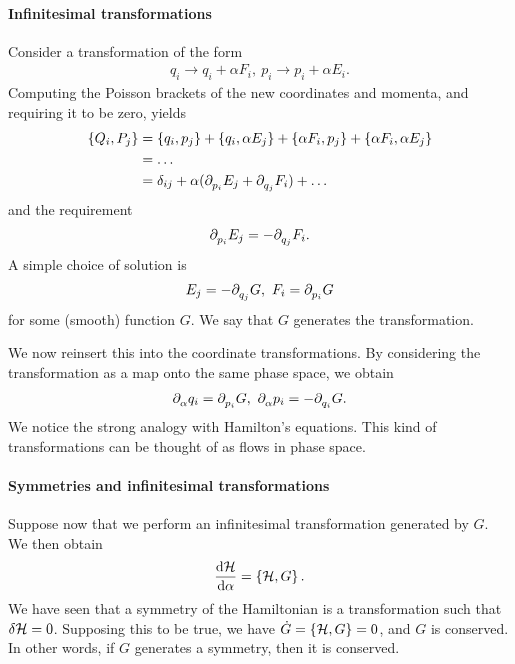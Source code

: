 \paragraph{Infinitesimal transformations}
Consider a transformation of the form
\begin{align*}
	q_{i} \to q_{i} + \alpha F_{i},\ p_{i} \to p_{i} + \alpha E_{i}.
\end{align*}
Computing the Poisson brackets of the new coordinates and momenta, and requiring it to be zero, yields
\begin{align*}
	\left\{Q_{i}, P_{j}\right\} &= \left\{q_{i}, p_{j}\right\} + \left\{q_{i}, \alpha E_{j}\right\} + \left\{\alpha F_{i}, p_{j}\right\} + \left\{\alpha F_{i}, \alpha E_{j}\right\} \\
	                   &= \dots \\
	                   &= \delta_{ij} + \alpha(\partial^{}_{p_{i}}E_{j} + \partial^{}_{q_{j}}F_{i}) + \dots
\end{align*}
and the requirement
\begin{align*}
	\partial^{}_{p_{i}}E_{j} = -\partial^{}_{q_{j}}F_{i}.
\end{align*}
A simple choice of solution is
\begin{align*}
	E_{j} = -\partial^{}_{q_{j}}G,\ F_{i} = \partial^{}_{p_{i}}G
\end{align*}
for some (smooth) function $G$. We say that $G$ generates the transformation.

We now reinsert this into the coordinate transformations. By considering the transformation as a map onto the same phase space, we obtain
\begin{align*}
	\partial^{}_{\alpha}q_{i} = \partial^{}_{p_{i}}G,\ \partial^{}_{\alpha}p_{i} = -\partial^{}_{q_{i}}G.
\end{align*}
We notice the strong analogy with Hamilton's equations. This kind of transformations can be thought of as flows in phase space. 

\paragraph{Symmetries and infinitesimal transformations}
Suppose now that we perform an infinitesimal transformation generated by $G$. We then obtain
\begin{align*}
	\dv{\mathcal{H}}{\alpha} = \left\{\mathcal{H}, G\right\}.
\end{align*}
We have seen that a symmetry of the Hamiltonian is a transformation such that $\delta \mathcal{H} = 0$. Supposing this to be true, we have $\dot{G} = \left\{\mathcal{H}, G\right\} = 0$, and $G$ is conserved. In other words, if $G$ generates a symmetry, then it is conserved.

